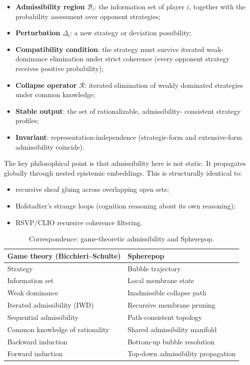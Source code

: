 \documentclass[12pt, a4paper]{article}
\theoremstyle{plain}
\theoremstyle{definition}
\theoremstyle{remark}
\newcommand{\Rcal}{\mathcal{R}}
\newcommand{\Bcal}{\mathcal{B}}
\begin{document}
\begin{itemize}
  \item \textbf{Admissibility region} $\Bcal_i$: the information set
        of player $i$, together with the probability assessment over
        opponent strategies;
  \item \textbf{Perturbation} $\Delta_i$: a new strategy or
        deviation possibility;
  \item \textbf{Compatibility condition}: the strategy must survive
        iterated weak-dominance elimination under strict coherence
        (every opponent strategy receives positive probability);
  \item \textbf{Collapse operator} $\Rcal$: iterated elimination of
        weakly dominated strategies under common knowledge;
  \item \textbf{Stable output}: the set of rationalizable, admissibility-
        consistent strategy profiles;
  \item \textbf{Invariant}: representation-independence
        (strategic-form and extensive-form admissibility coincide).
\end{itemize}

The key philosophical point is that admissibility here is not static.
It propagates globally through nested epistemic embeddings.
This is structurally identical to:
\begin{itemize}
  \item recursive sheaf gluing across overlapping open sets;
  \item Hofstadter's strange loops (cognition reasoning about its own
        reasoning);
  \item RSVP/CLIO recursive coherence filtering.
\end{itemize}

\begin{table}[h!]
\centering
\caption{Correspondence: game-theoretic admissibility and Spherepop.}
\label{tab:game-spherepop}
\begin{tabular}{ll}
\toprule
\textbf{Game theory (Bicchieri--Schulte)} & \textbf{Spherepop} \\
\midrule
Strategy                      & Bubble trajectory \\
Information set               & Local membrane state \\
Weak dominance                & Inadmissible collapse path \\
Iterated admissibility (IWD)  & Recursive membrane pruning \\
Sequential admissibility      & Path-consistent topology \\
Common knowledge of rationality & Shared admissibility manifold \\
Backward induction            & Bottom-up bubble resolution \\
Forward induction             & Top-down admissibility propagation \\
\bottomrule
\end{tabular}
\end{table}
\end{document}
